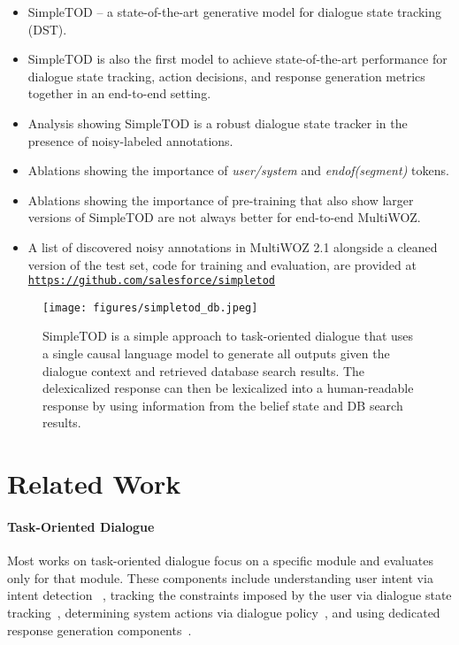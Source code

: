 \documentclass{article}
\begin{document}
\begin{itemize}



\item SimpleTOD --  a state-of-the-art generative model for dialogue state tracking (DST). 
\item SimpleTOD is also the first model to achieve state-of-the-art performance for dialogue state tracking, action decisions, and response generation metrics together in an end-to-end setting. 
\item Analysis showing SimpleTOD is a robust dialogue state tracker in the presence of noisy-labeled annotations. 
\item Ablations showing the importance of \textit{user/system} and \textit{endof(segment)} tokens.
\item Ablations showing the importance of pre-training that also show larger versions of SimpleTOD are not always better for end-to-end MultiWOZ.
\item A list of discovered noisy annotations in MultiWOZ 2.1 alongside a cleaned version of the test set, code for training and evaluation, are 
provided at \texttt{\url{https://github.com/salesforce/simpletod}}
\end{itemize}

\begin{figure*}[t!]
\centering
\texttt{[image: figures/simpletod\_db.jpeg]}


  \caption{SimpleTOD is a simple approach to task-oriented dialogue that uses a single causal language model to generate all outputs given the dialogue context and retrieved database search results. 
  The delexicalized response can then be lexicalized into a human-readable response by using information from the belief state and DB search results.}
  \label{fig:model}
\end{figure*}

%
 \section{Related Work}
\label{sec:related-works}

\paragraph{Task-Oriented Dialogue}
Most works on task-oriented dialogue focus on a specific module and evaluates only for that module. 
These components include understanding user intent via intent detection ~\citep{liu2016attentionbasedrnn}, 
tracking the constraints imposed by the user via dialogue state tracking~\citep{henderson2013deep, mrksic2017neuralbelief, rastogi2017scalable, nouri2018toward, trade2019wu, zhang2019find, zhou2019multi, schema2020chen, heck2020trippy}, 
determining system actions via dialogue policy~\citep{wen2017action}, 
and using dedicated response generation components~\citep{wen2015sclstm}.
\end{document}
